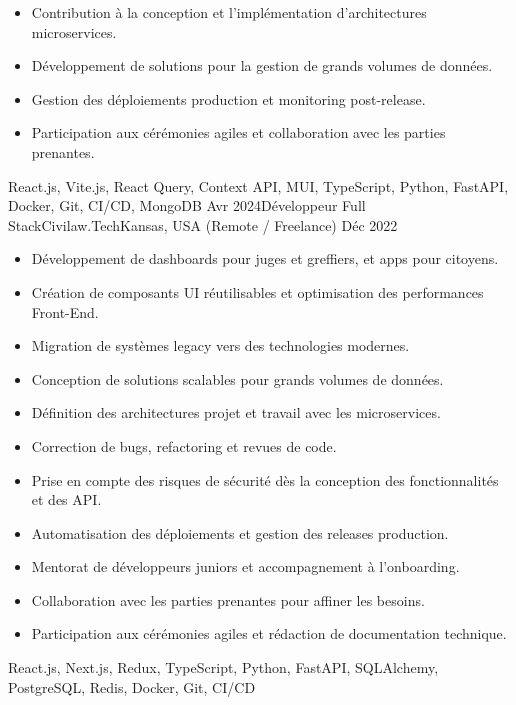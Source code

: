 \begin{experiences}
{\begin{itemize}
                \item Contribution à la conception et l'implémentation d'architectures microservices.
                \item Développement de solutions pour la gestion de grands volumes de données.
                \item Gestion des déploiements production et monitoring post-release.
                \item Participation aux cérémonies agiles et collaboration avec les parties prenantes.
            \end{itemize}}
            {React.js, Vite.js, React Query, Context API, MUI, TypeScript, Python, FastAPI, Docker, Git, CI/CD, MongoDB}
    \emptySeparator
    \experience
        {Avr 2024}{Développeur Full Stack}{Civilaw.Tech}{Kansas, USA (Remote / Freelance)}
        {Déc 2022}
            {\begin{itemize}
                \item Développement de dashboards pour juges et greffiers, et apps pour citoyens.
                \item Création de composants UI réutilisables et optimisation des performances Front-End.
                \item Migration de systèmes legacy vers des technologies modernes.
                \item Conception de solutions scalables pour grands volumes de données.
                \item Définition des architectures projet et travail avec les microservices.
                \item Correction de bugs, refactoring et revues de code.
                \item Prise en compte des risques de sécurité dès la conception des fonctionnalités et des API.
                \item Automatisation des déploiements et gestion des releases production.
                \item Mentorat de développeurs juniors et accompagnement à l'onboarding.
                \item Collaboration avec les parties prenantes pour affiner les besoins.
                \item Participation aux cérémonies agiles et rédaction de documentation technique.
            \end{itemize}}
            {React.js, Next.js, Redux, TypeScript, Python, FastAPI, SQLAlchemy, PostgreSQL, Redis, Docker, Git, CI/CD}
    \emptySeparator

\end{experiences}
